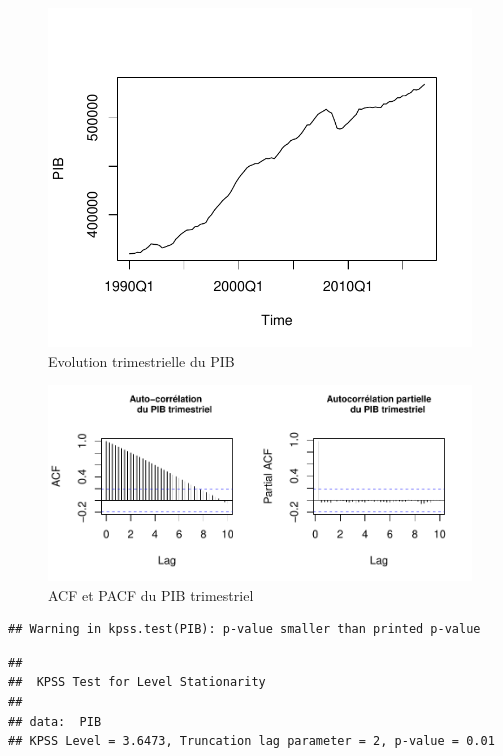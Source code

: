 \documentclass[11pt,]{article}
\begin{document}
\begin{figure}

{\centering \includegraphics{doc_files/figure-latex/unnamed-chunk-3-1} 

}

\caption{\label{fig3} Evolution trimestrielle du PIB}\label{fig:unnamed-chunk-3}
\end{figure}

\begin{figure}[htbp]
\centering
\includegraphics{doc_files/figure-latex/unnamed-chunk-4-1.pdf}
\caption{\label{fig4} ACF et PACF du PIB trimestriel}
\end{figure}

\begin{verbatim}
## Warning in kpss.test(PIB): p-value smaller than printed p-value
\end{verbatim}

\begin{verbatim}
## 
##  KPSS Test for Level Stationarity
## 
## data:  PIB
## KPSS Level = 3.6473, Truncation lag parameter = 2, p-value = 0.01
\end{verbatim}
\end{document}

